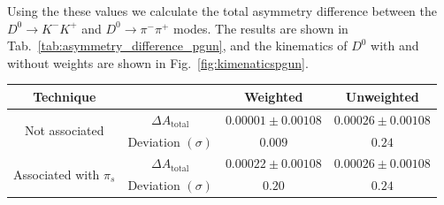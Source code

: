 \documentclass{article}
\begin{document}
        Using the these values we calculate the total asymmetry difference between the $D^0\to K^-K^+$ and $D^0\to \pi^-\pi^+$ modes.
        The results are shown in Tab.~\ref{tab:asymmetry_difference_pgun}, and the kinematics of $D^0$ with and without weights are shown in Fig.~\ref{fig:kimenaticspgun}.
        \begin{center}
                \begin{tabular}{c|c|c|c}
                        Technique & & Weighted & Unweighted\\
                        \hline\hline
                        \multirow{2}{*}{Not associated} & $\Delta A_\text{total}$ & $0.00001 \pm 0.00108$ & $0.00026 \pm 0.00108$\\
                        & Deviation $(\sigma)$ & $0.009$ & $0.24$\\
                        \hline
                        \multirow{2}{*}{Associated with $\pi_s$} & $\Delta A_\text{total}$ & $0.00022 \pm 0.00108$ & $0.00026 \pm 0.00108$\\
                        & Deviation $(\sigma)$ & $0.20$ & $0.24$\\
                \end{tabular}
                \label{tab:asymmetry_difference_pgun}
        \end{center}
\end{document}
